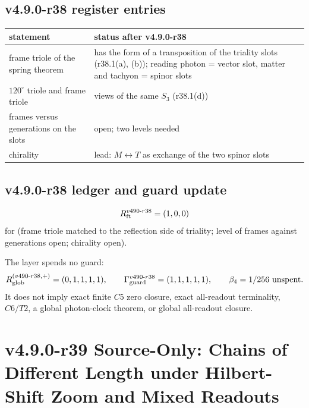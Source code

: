 \subsection*{v4.9.0-r38 register entries}
\label{subsec:v490-r38-register}

\begin{center}
\small
\begin{tabular}{@{}>{\raggedright\arraybackslash}p{}>{\raggedright\arraybackslash}p{}@{}}
\toprule
statement & status after v4.9.0-r38\\
\midrule
frame triole of the spring theorem & has the form of a transposition of the triality slots (r38.1(a), (b)); reading photon = vector slot, matter and tachyon = spinor slots\\
\(120^\circ\) triole and frame triole & views of the same \(S_3\) (r38.1(d))\\
frames versus generations on the slots & open; two levels needed\\
chirality & lead: \(M\leftrightarrow T\) as exchange of the two spinor slots\\
\bottomrule
\end{tabular}
\end{center}

\subsection*{v4.9.0-r38 ledger and guard update}
\label{subsec:v490-r38-ledger-guard}

\[
R_{\rm ft}^{v490\text{-}r38}=(1,0,0)
\]
for (frame triole matched to the reflection side of triality; level of frames against generations open; chirality open).

The layer spends no guard:
\[
R_{\rm glob}^{(v490\text{-}r38,+)}=(0,1,1,1,1),
\qquad
\Gamma_{\rm guard}^{v490\text{-}r38}=(1,1,1,1,1),
\qquad
\beta_4=1/256\ \text{unspent}.
\]
It does not imply exact finite \(C5\) zero closure, exact all-readout terminality,
\(C6/T2\), a global photon-clock theorem, or global all-readout closure.
\clearpage
\section*{v4.9.0-r39 Source-Only: Chains of Different Length under Hilbert-Shift Zoom and Mixed Readouts}
\label{sec:v490-r39-chains-zoom-mixed}

